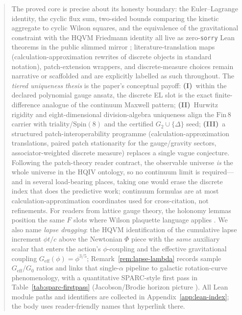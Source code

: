 \documentclass[11pt]{amsart}
\begin{document}
\begin{abstract}
The proved core is precise about its honesty boundary: the Euler--Lagrange identity, the cyclic flux sum, two-sided bounds comparing the kinetic aggregate to cyclic Wilson squares, and the equivalence of the gravitational constraint with the HQVM Friedmann identity all live as zero-\texttt{sorry} Lean theorems in the public slimmed mirror \cite{hqiv-lean}; literature-translation maps (calculation-approximation rewrites of discrete objects in standard notation), patch-extension wrappers, and discrete-measure choices remain narrative or scaffolded and are explicitly labelled as such throughout. The \emph{tiered uniqueness thesis} is the paper's conceptual payoff: \textbf{(I)}~within the declared polynomial gauge ansatz, the discrete EL slot is the exact finite-difference analogue of the continuum Maxwell pattern; \textbf{(II)}~Hurwitz rigidity and eight-dimensional division-algebra uniqueness align the \(\mathrm{Fin}\,8\) carrier with triality/\(\mathrm{Spin}(8)\) and the certified \(G_2\cup\{\Delta\}\) seed; \textbf{(III)}~a structured patch-interoperability programme (calculation-approximation translations, paired patch stationarity for the gauge/gravity sectors, associator-weighted discrete measure) replaces a single vague conjecture. Following the patch-theory reader contract, the observable universe \emph{is} the whole universe in the HQIV ontology, so no continuum limit is required---and in several load-bearing places, taking one would erase the discrete index that does the predictive work; continuum formulas are at most calculation-approximation coordinates used for cross-citation, not refinements. For readers from lattice gauge theory, the holonomy lemmas position the same \(F\) slots where Wilson plaquette language applies \cite{wilson1974,creutz1983}. We also name \emph{lapse dragging}: the HQVM identification of the cumulative lapse increment \(\phi t/c\) above the Newtonian \(\Phi\) piece with the \emph{same} auxiliary scalar that enters the action's \(\phi\)-coupling and the effective gravitational coupling \(G_{\mathrm{eff}}(\phi)=\phi^{3/5}\); Remark~\ref{rem:lapse-lambda} records sample \(G_{\mathrm{eff}}/G_0\) ratios and links that single-\(\alpha\) pipeline to galactic rotation-curve phenomenology, with a quantitative SPARC-style first pass in Table~\ref{tab:sparc-firstpass} (Jacobson/Brodie horizon picture \cite{jacobson1995,brodie2026,lelli2016sparc}). All Lean module paths and identifiers are collected in Appendix~\ref{app:lean-index}; the body uses reader-friendly names that hyperlink there.
\end{abstract}
\maketitle
\end{document}
